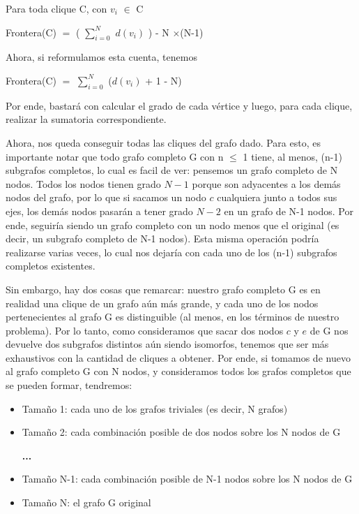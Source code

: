 \begin{center}
Para toda clique C, con ${v_i}$ $\in$ C

Frontera(C) $=$ ( $\sum_{i=0}^{N}$ ${d(v_i)}$ ) - N $\times$(N-1)
\end{center}

Ahora, si reformulamos esta cuenta, tenemos 
\begin{center}
Frontera(C) $=$ $\sum_{i=0}^{N}$ (${d(v_i)}$ + 1 - N)
\end{center}

Por ende, bastará con calcular el grado de cada vértice y luego, para cada clique, realizar la sumatoria correspondiente.

Ahora, nos queda conseguir todas las cliques del grafo dado. Para esto, es importante notar que todo grafo completo G con n $\leq$ 1 tiene, al menos, (n-1) subgrafos completos, lo cual es facil de ver: pensemos un grafo completo de N nodos. Todos los nodos tienen grado ${N-1}$ porque son adyacentes a los demás nodos del grafo, por lo que si sacamos un nodo ${c}$ cualquiera junto a todos sus ejes, los demás nodos pasarán a tener grado ${N-2}$ en un grafo de N-1 nodos. Por ende, seguiría siendo un grafo completo con un nodo menos que el original (es decir, un subgrafo completo de N-1 nodos). Esta misma operación podría realizarse varias veces, lo cual nos dejaría con cada uno de los (n-1) subgrafos completos existentes.

Sin embargo, hay dos cosas que remarcar: nuestro grafo completo G es en realidad una clique de un grafo aún más grande, y cada uno de los nodos pertenecientes al grafo G es distinguible (al menos, en los términos de nuestro problema). Por lo tanto, como consideramos que sacar dos nodos ${c}$ y ${e}$ de G nos devuelve dos subgrafos distintos aún siendo isomorfos, tenemos que ser más exhaustivos con la cantidad de cliques a obtener. Por ende, si tomamos de nuevo al grafo completo G con N nodos, y consideramos todos los grafos completos que se pueden formar, tendremos:

\begin{itemize}
	\item Tamaño 1: cada uno de los grafos triviales (es decir, N grafos)
	
	\item Tamaño 2: cada combinación posible de dos nodos sobre los N nodos de G
	
	\textbf{...}
	
	\item Tamaño N-1: cada combinación posible de N-1 nodos sobre los N nodos de G
	
	\item Tamaño N: el grafo G original
\end{itemize}

